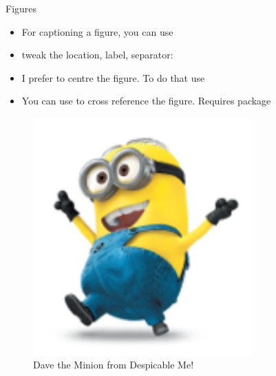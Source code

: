 \documentclass[10pt,times]{beamer}
\begin{document}
\begin{frame}[fragile]{Figures}
\begin{itemize}
\item For captioning a figure, you can use 

\item tweak the location, label, separator: 

\item I prefer to centre the figure. To do that use 

\item You can use  to cross reference the 
figure. Requires package 

\end{itemize}
\begin{exampletwoup}
\begin{figure}
\centering
\includegraphics[width=0.75\textwidth]
                           {figs/minion}
\caption[Minion]{
	Dave the Minion from Despicable Me!}
\label{fig:minion} %
\end{figure}
\end{exampletwoup}
\end{frame}
\end{document}
